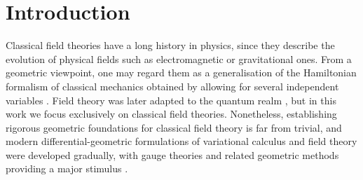 \documentclass[11pt,twoside]{article}
\theoremstyle{plain}
\theoremstyle{definition}
\theoremstyle{remark}
\begin{document}
\pagestyle{fancy}


\fancyhead[RE]{}
\fancyhead[LO]{}    %

\fancyfoot[L]{}     %
\fancyfoot[C]{\thepage}                  %
\fancyfoot[R]{}            %


\renewcommand{\headrulewidth}{0.1pt}  %
\renewcommand{\footrulewidth}{0pt}    %

\renewcommand{\headrule}{%
    \vspace{3pt}                %
    \hrule width\headwidth height 0.4pt %
    \vspace{0pt}                %
}

\setlength{\headsep}{30pt}  %




 
\section{Introduction}

Classical field theories have a long history in physics, since they describe the evolution of physical fields such as electromagnetic or gravitational ones. From a geometric viewpoint, one may regard them as a generalisation of the Hamiltonian formalism of classical mechanics obtained by allowing for several independent variables \cite{Pri_14,GRR_20,LMM_03,KT_79,BC_23,CRS_00,LSV_15}. Field theory was later adapted to the quantum realm \cite{BrunettiFredenhagenVerch2003,Fewster2015,Rejzner2016}, but in this work we focus exclusively on classical field theories. Nonetheless, establishing rigorous geometric foundations for classical field theory is far from trivial, and modern differential-geometric formulations of variational calculus and field theory were developed gradually, with gauge theories and related geometric methods providing a major stimulus \cite{AA_80,LR_85,LSV_15,KT_79}.
\end{document}
